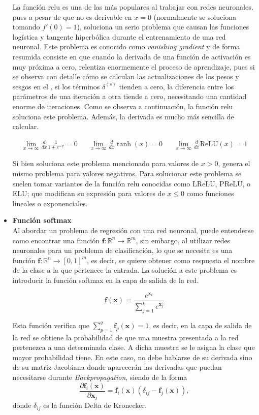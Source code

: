 \begin{itemize}
				La función \gls{relu} es una de las más populares al trabajar con redes neuronales, pues a pesar de que no es derivable en $x = 0$ (normalmente se soluciona tomando $f'(0) = 1$), soluciona un serio problema que causan las funciones logística y tangente hiperbólica durante el entrenamiento de una red neuronal. Este problema es conocido como \textit{vanishing gradient} y de forma resumida consiste en que cuando la derivada de una función de activación es muy próxima a cero, relentiza enormemente el proceso de aprendizaje, pues si se observa con detalle cómo se calculan las actualizaciones de los pesos y sesgos en el , si los términos $\delta^{(s)}$ tienden a cero, la diferencia entre los parámetros de una iteración a otra tiende a cero, necesitando una cantidad enorme de iteraciones. Como se observa a continuación, la función \gls{relu} soluciona este problema. Además, la derivada es mucho más sencilla de calcular. 
				
				\begin{align*}
					\lim_{x\to\infty}\frac{d}{dx}\frac{1}{1+e^{-x}} = 0 && \lim_{x\to\infty}\frac{d}{dx}\tanh(x) = 0 && \lim_{x\to\infty}\frac{d}{dx}\text{ReLU}(x) = 1
				\end{align*}
				
				Si bien soluciona este problema mencionado para valores de $x > 0$, genera el mismo problema para valores negativos. Para solucionar este problema se suelen tomar variantes de la función \gls{relu} conocidas como LReLU, PReLU, o ELU; que modifican su expresión para valores de $x \leq 0$ como funciones lineales o exponenciales. 
				
				\item \textbf{Función softmax}\\
				
				Al abordar un problema de regresión con una red neuronal, puede entenderse como encontrar una función $\textbf{f}: \mathbb{R}^n \longrightarrow \mathbb{R}^m$, sin embargo, al utilizar redes neuronales para un problema de clasificación, lo que se necesita es una función $\textbf{f}: \mathbb{R}^n \longrightarrow [0, 1]^m$, es decir, se quiere obtener como respuesta el nombre de la clase a la que pertenece la entrada. La solución a este problema es introducir la función softmax en la capa de salida de la red. 
				
				$$
				\textbf{f}(\textbf{x}) = \frac{e^{\textbf{x}_i}}{\displaystyle\sum_{j = 1}^{k}e^{\textbf{x}_j}}
				$$
				
				Esta función verifica que $\sum_{p=1}^q \textbf{f}_p(\textbf{x}) = 1$, es decir, en la capa de salida de la red se obtiene la probabilidad de que una muestra presentada a la red pertenezca a una determinada clase. A dicha muestra se le asigna la clase que mayor probabilidad tiene. En este caso, no debe hablarse de su derivada sino de su matriz Jacobiana donde aparecerán las derivadas que puedan necesitarse durante \textit{Backpropagation}, siendo de la forma
				$$
				\frac{\partial \textbf{f}_i(\textbf{x})}{\partial \textbf{x}_j} = \textbf{f}_i(\textbf{x})(\delta_{ij} - \textbf{f}_j(\textbf{x})), 
				$$
				donde $\delta_{ij}$ es la función Delta de Kronecker. 
				

\end{itemize}
